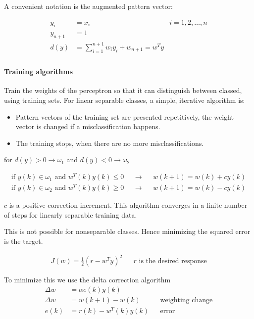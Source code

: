 A convenient notation is the augmented pattern vector:

\begin{align*}
y_i &= x_i & i=1,2,\dots,n \\
y_{n+1} &= 1 \\
d(y) &= \sum_{i=1}^{n+1}w_iy_i + w_{n+1} = w^Ty \\
\end{align*}

\paragraph{Training algorithms}
Train the weights of the perceptron so that it can distinguish between classed, using training sets.
For linear separable classes, a simple, iterative algorithm is:
\begin{itemize}
\item
Pattern vectors of the training set are presented repetitively, the weight vector is changed if a misclassification happens.
\item The training stops, when there are no more misclassifications.
\end{itemize}

for $d(y)>0 \rightarrow \omega_1$ and $d(y)<0 \rightarrow \omega_2$

\begin{align*}
\text{if } y(k) \in \omega_1 \text{ and } w^T(k)y(k) \leq 0 && \rightarrow && w(k+1) = w(k) +cy(k) \\
\text{if } y(k) \in \omega_2 \text{ and } w^T(k)y(k) \geq 0 && \rightarrow && w(k+1) = w(k)-cy(k)
\end{align*}


$c$ is a positive correction increment.
This algorithm converges in a finite number of steps for linearly separable training data.

This is not possible for nonseparable classes.
Hence minimizing the squared error is the target.

\begin{align*}
J(w) = \frac{1}{2}(r-w^Ty)^2
&& r \text{ is the desired response}
\end{align*}

To minimize this we use the delta correction algorithm
\begin{align*}
\Delta w &= \alpha e(k)y(k) \\
\Delta w &= w(k+1)-w(k) && \text{weighting change} \\
e(k) &= r(k) - w^T(k)y(k) && \text{error}
\end{align*}

